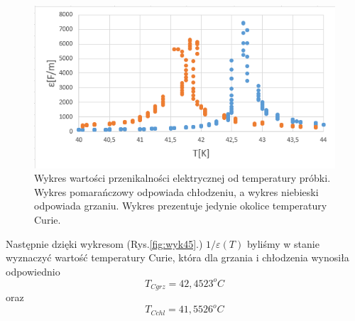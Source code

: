\documentclass{article}
\begin{document}
\begin{figure}[!h]
	\centering
	\includegraphics[width=0.7\linewidth]{wyk3.png}
	\caption{Wykres wartości przenikalności elektrycznej od temperatury próbki. Wykres pomarańczowy odpowiada chłodzeniu, a wykres niebieski odpowiada grzaniu. Wykres prezentuje jedynie okolice temperatury Curie. }
	\label{fig:wyk3}
\end{figure}

Następnie dzięki wykresom (Rys.\ref{fig:wyk45}.) $1/\varepsilon(T)$ byliśmy w stanie wyznaczyć wartość temperatury Curie, która dla grzania i chłodzenia wynosiła odpowiednio 
\begin{equation}
T_{C grz}=42,4523^{o}C
\end{equation}
oraz
\begin{equation}
T_{C chl}=41,5526^{o}C
\end{equation}
\end{document}
